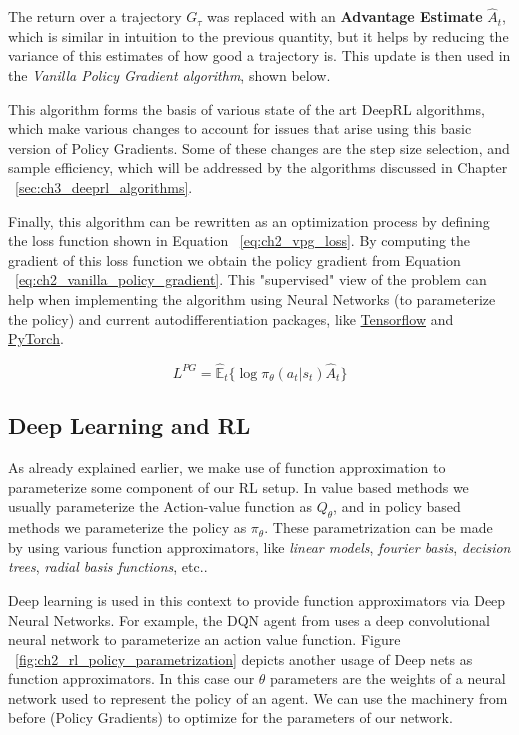 The return over a trajectory $G_{\tau}$ was replaced with an \textbf{Advantage Estimate}
$\hat A_{t}$, which is similar in intuition to the previous quantity, but it helps
by reducing the variance of this estimates of how good a trajectory is. This update
is then used in the \textit{Vanilla Policy Gradient algorithm}, shown below.

\algVanillaPolicyGradients

This algorithm forms the basis of various state of the art DeepRL algorithms, which
make various changes to account for issues that arise using this basic version of 
Policy Gradients. Some of these changes are the step size selection, and sample
efficiency, which will be addressed by the algorithms discussed in Chapter ~\ref{sec:ch3_deeprl_algorithms}.

Finally, this algorithm can be rewritten as an optimization process by defining the
loss function shown in Equation ~\ref{eq:ch2_vpg_loss}. By computing the gradient 
of this loss function we obtain the policy gradient from Equation ~\ref{eq:ch2_vanilla_policy_gradient}.
This "supervised" view of the problem can help when implementing the algorithm
using Neural Networks (to parameterize the policy) and current autodifferentiation 
packages, like \href{https://tensorflow.org}{Tensorflow} and \href{https://pytorch.org}{PyTorch}. 

\begin{equation} \label{eq:ch2_vpg_loss}
    L^{PG} = \mathbb{\hat E}_{t} \lbrace \log \pi_{\theta} (a_{t} | s_{t}) \hat A_{t} \rbrace
\end{equation}

\subsection{Deep Learning and RL}

As already explained earlier, we make use of function approximation to parameterize
some component of our RL setup. In value based methods we usually parameterize the
Action-value function as $Q_{\theta}$, and in policy based methods we parameterize
the policy as $\pi_{\theta}$. These parametrization can be made by using various
function approximators, like \textit{linear models}, \textit{fourier basis}, 
\textit{decision trees}, \textit{radial basis functions}, etc..

Deep learning is used in this context to provide function approximators via Deep
Neural Networks. For example, the DQN agent from \cite{DQNAtari} uses a deep convolutional
neural network to parameterize an action value function. Figure ~\ref{fig:ch2_rl_policy_parametrization}
depicts another usage of Deep nets as function approximators. In this case our 
$\theta$ parameters are the weights of a neural network used to represent the policy 
of an agent. We can use the machinery from before (Policy Gradients) to optimize for 
the parameters of our network.

